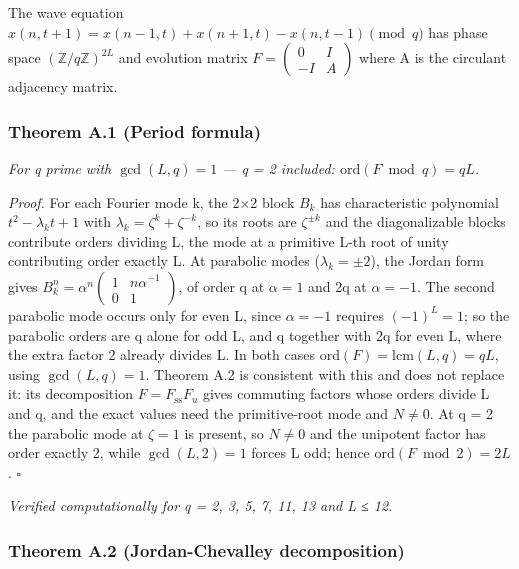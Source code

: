 \documentclass[
]{article}
\begin{document}
The wave equation
\(x(n, t+1) = x(n-1, t) + x(n+1, t) - x(n, t-1) \pmod{q}\) has phase
space \((\mathbb{Z}/q\mathbb{Z})^{2L}\) and evolution matrix
\(F = \left(\begin{smallmatrix} 0 & I \\ -I & A \end{smallmatrix}\right)\)
where A is the circulant adjacency matrix.

\hypertarget{theorem-a.1-period-formula}{%
\subsubsection{Theorem A.1 (Period
formula)}\label{theorem-a.1-period-formula}}

\emph{For q prime with \(\gcd(L, q) = 1\) --- q = 2 included:
\(\mathrm{ord}(F \bmod q) = qL\).}

\emph{Proof.} For each Fourier mode k, the 2×2 block \(B_k\) has
characteristic polynomial \(t^2 - \lambda_k t + 1\) with
\(\lambda_k = \zeta^k + \zeta^{-k}\), so its roots are \(\zeta^{\pm k}\)
and the diagonalizable blocks contribute orders dividing L, the mode at
a primitive L-th root of unity contributing order exactly L. At
parabolic modes (\(\lambda_k = \pm 2\)), the Jordan form gives
\(B_k^n = \alpha^n \left(\begin{smallmatrix} 1 & n\alpha^{-1} \\ 0 & 1 \end{smallmatrix}\right)\),
of order q at \(\alpha = 1\) and 2q at \(\alpha = -1\). The second
parabolic mode occurs only for even L, since \(\alpha = -1\) requires
\((-1)^L = 1\); so the parabolic orders are q alone for odd L, and q
together with 2q for even L, where the extra factor 2 already divides L.
In both cases \(\mathrm{ord}(F) = \mathrm{lcm}(L, q) = qL\), using
\(\gcd(L, q) = 1\). Theorem A.2 is consistent with this and does not
replace it: its decomposition \(F = F_{\mathrm{ss}} F_u\) gives
commuting factors whose orders divide L and q, and the exact values need
the primitive-root mode and \(N \neq 0\). At q = 2 the parabolic mode at
\(\zeta = 1\) is present, so \(N \neq 0\) and the unipotent factor has
order exactly 2, while \(\gcd(L, 2) = 1\) forces L odd; hence
\(\mathrm{ord}(F \bmod 2) = 2L\). \(\square\)

\emph{Verified computationally for q = 2, 3, 5, 7, 11, 13 and L ≤ 12.}

\hypertarget{theorem-a.2-jordan-chevalley-decomposition}{%
\subsubsection{Theorem A.2 (Jordan-Chevalley
decomposition)}\label{theorem-a.2-jordan-chevalley-decomposition}}
\end{document}
